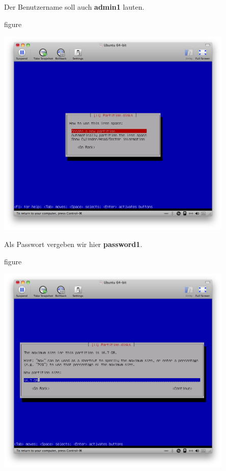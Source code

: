 Der Benutzername soll auch \textbf{admin1} lauten.

\begin{nofloat}{figure}
\begin{center}
\includegraphics[width=0.85\textwidth]{screenshots/22_ubuntu_install.png}
\end{center}
\end{nofloat}

\pagebreak
Als Passwort vergeben wir hier \textbf{password1}.

\begin{nofloat}{figure}
\begin{center}
\includegraphics[width=0.85\textwidth]{screenshots/23_ubuntu_install.png}
\end{center}
\end{nofloat}

